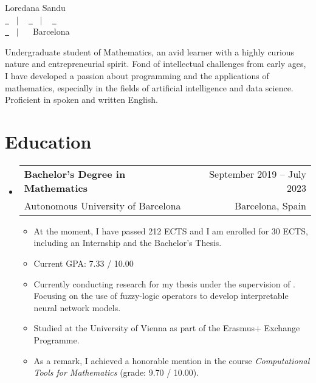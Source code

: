 \documentclass[a4paper,11pt]{article}
\makeatletter
\newcommand{\resumeQuadHeading}[4]{
  \item
  \begin{tabular*}{0.96\textwidth}[t]{l@{\extracolsep{\fill}}r}
    \textbf{#1} & \small #2 \\
    \small#3 & \small #4 \\
  \end{tabular*}
}
\newcommand{\resumeHeadingListStart}{
  \begin{itemize}[leftmargin=0.15in, label={}]
}
\newcommand{\resumeHeadingListEnd}{\end{itemize}}
\makeatother
\begin{document}
\begin{center}
    {\Huge Loredana Sandu \vspace{2pt}} \\[1.25pc]
    \href{https://loredanasandu.com}{\faLink \ } \ $|$ \ %
    \href{https://www.linkedin.com/in/loredana-sandu/}{\faLinkedinSquare \ } \ $|$ \ %
    \href{https://www.github.com/loredanasandu}{\faGithub \ } \\[0.1pc] %
    \href{mailto:loredana@loredanasandu.com}{\faEnvelope \ } \ $|$ \ %
    \faHome \ Barcelona \\[1.5pc] %
\end{center}

\begin{justify}
    Undergraduate student of Mathematics, an avid learner with a highly curious nature and entrepreneurial spirit. Fond of intellectual challenges from early ages, I have developed a passion about programming and the applications of mathematics, especially in the fields of artificial intelligence and data science. Proficient in spoken and written English.
\end{justify}



\section{Education}
    \resumeHeadingListStart{}
      \resumeQuadHeading{Bachelor's Degree in Mathematics}{September 2019 – July 2023}
      {Autonomous University of Barcelona}{Barcelona, Spain}
      \begin{itemize}[leftmargin=3em, itemsep=0.1em, topsep=2pt]
          \item \small At the moment, I have passed 212 ECTS and I am enrolled for 30 ECTS, including an Internship and the Bachelor's Thesis.
          \item \small Current GPA: 7.33 / 10.00
          \item \small Currently conducting research for my thesis under the supervision of \href{https://www.iiia.csic.es/es/people/person/?person_id=35}{}. Focusing on the use of fuzzy-logic operators to develop interpretable neural network models.
          \item \small Studied at the University of Vienna as part of the Erasmus+ Exchange Programme.
          \item \small As a remark, I achieved a honorable mention in the course \textit{Computational Tools for Mathematics} (grade: 9.70 / 10.00). 
      \end{itemize}
    \resumeHeadingListEnd{}
\end{document}
